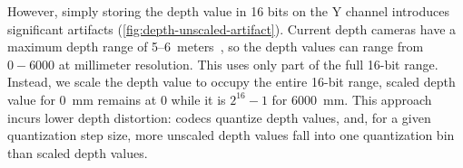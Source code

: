 However, simply storing the depth value in 16 bits on the Y channel introduces significant artifacts (\cref{fig:depth-unscaled-artifact}).
%
Current depth cameras have a maximum depth range of 5--6~meters~\cite{kinect-spec, realsense-spec}, so the depth values can range from $0-6000$ at millimeter resolution.
%
%
This uses only part of the full 16-bit range.
%
Instead, we scale the depth value to occupy the entire 16-bit range, \ie scaled depth value for 0~mm remains at 0 while it is $2^{16}-1$ for 6000~mm.
%
This approach incurs lower depth distortion: codecs quantize depth values, and, for a given quantization step size, more unscaled depth values fall into one quantization bin than scaled depth values.
%
%



